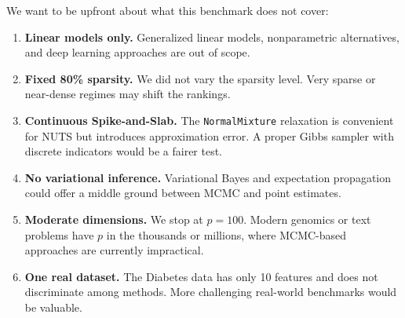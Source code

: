 We want to be upfront about what this benchmark does not cover:

\begin{enumerate}[nosep]
    \item \textbf{Linear models only.} Generalized linear models, nonparametric alternatives, and deep learning approaches are out of scope.
    \item \textbf{Fixed 80\% sparsity.} We did not vary the sparsity level. Very sparse or near-dense regimes may shift the rankings.
    \item \textbf{Continuous Spike-and-Slab.} The \texttt{NormalMixture} relaxation is convenient for NUTS but introduces approximation error. A proper Gibbs sampler with discrete indicators would be a fairer test.
    \item \textbf{No variational inference.} Variational Bayes and expectation propagation could offer a middle ground between MCMC and point estimates.
    \item \textbf{Moderate dimensions.} We stop at $p = 100$. Modern genomics or text problems have $p$ in the thousands or millions, where MCMC-based approaches are currently impractical.
    \item \textbf{One real dataset.} The Diabetes data has only 10 features and does not discriminate among methods. More challenging real-world benchmarks would be valuable.
\end{enumerate}
